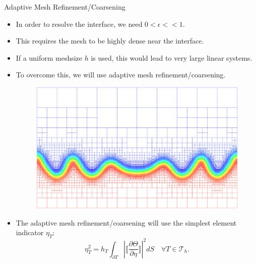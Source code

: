 \documentclass[9pt]{beamer}
\newcommand{\abs}[1]{\left\vert#1\right\vert}
\newcommand{\eps}{\epsilon}
\begin{document}
\begin{frame}{Adaptive Mesh Refinement/Coarsening}
\begin{itemize}
\item In order to resolve the interface, we need $0 < \eps << 1$.
\item This requires the mesh to be highly dense near the interface.
\item If a uniform meshsize $h$ is used, this would lead to very large linear systems.
\item To overcome this, we will use adaptive mesh refinement/coarsening.
\begin{figure}[!ht]
\centering
\includegraphics[scale=.4]{Mesh.jpg}
\end{figure}
\item The adaptive mesh refinement/coarsening will use the simplest element indicator $\eta_T$:
$$
\eta_T^2 = h_T\int_{\partial T}\abs{\bigg\llbracket\frac{\partial \Theta}{\partial \eta}\bigg\rrbracket}^2dS \quad \forall T\in\mathcal{T}_h.
$$
\end{itemize}
\end{frame}
\end{document}

